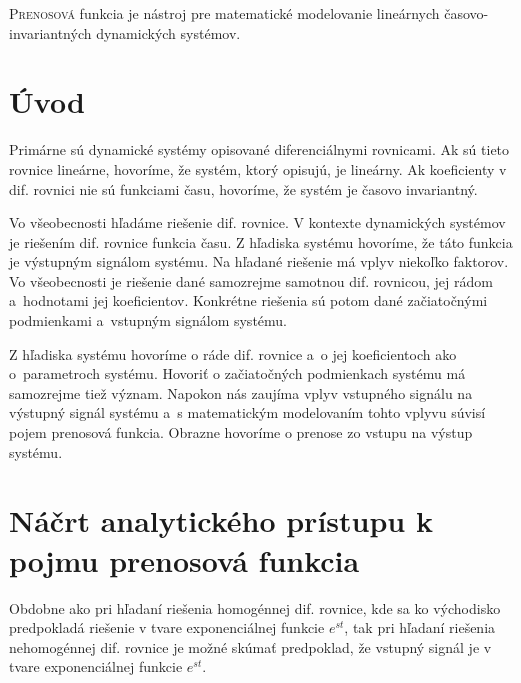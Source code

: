 \documentclass[a4paper, 10pt, ]{article}
\begin{document}
\normalsize
\normalfont












\noindent
\lettrine[lines=1, nindent=1pt, loversize=0.0]{P}{renosová} 
funkcia je nástroj pre matematické modelovanie lineárnych časovo-invariantných dynamických systémov.

\section{Úvod}

Primárne sú dynamické systémy opisované diferenciálnymi rovnicami. Ak sú tieto rovnice lineárne, hovoríme, že systém, ktorý opisujú, je lineárny. Ak koeficienty v dif. rovnici nie sú funkciami času, hovoríme, že systém je časovo invariantný.

Vo všeobecnosti hľadáme riešenie dif. rovnice. V kontexte dynamických systémov je riešením dif. rovnice funkcia času. Z hľadiska systému hovoríme, že táto funkcia je výstupným signálom systému. Na hľadané riešenie má vplyv niekoľko faktorov. Vo všeobecnosti je riešenie dané samozrejme samotnou dif. rovnicou, jej rádom a~hodnotami jej koeficientov. Konkrétne riešenia sú potom dané začiatočnými podmienkami a~vstupným signálom systému.

Z hľadiska systému hovoríme o ráde dif. rovnice a~o jej koeficientoch ako o~parametroch systému. Hovoriť o začiatočných podmienkach systému má samozrejme tiež význam. Napokon nás zaujíma vplyv vstupného signálu na výstupný signál systému a~s matematickým modelovaním tohto vplyvu súvisí pojem prenosová funkcia. Obrazne hovoríme o prenose zo vstupu na výstup systému.



\section{Náčrt analytického prístupu k pojmu prenosová funkcia}

Obdobne ako pri hľadaní riešenia homogénnej dif. rovnice, kde sa ko východisko predpokladá riešenie v tvare exponenciálnej funkcie $e^{s t}$, tak pri hľadaní riešenia nehomogénnej dif. rovnice je možné skúmať predpoklad, že vstupný signál je v tvare exponenciálnej funkcie $e^{s t}$. 
\end{document}
